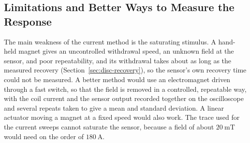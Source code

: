 \documentclass[12pt,a4paper]{article}
\begin{document}
\subsection{Limitations and Better Ways to Measure the Response}
\label{sec:disc-limitations}

The main weakness of the current method is the saturating stimulus. A hand-held magnet gives an uncontrolled withdrawal speed, an unknown field at the sensor, and poor repeatability, and its withdrawal takes about as long as the measured recovery (Section~\ref{sec:disc-recovery}), so the sensor's own recovery time could not be measured. A better method would use an electromagnet driven through a fast switch, so that the field is removed in a controlled, repeatable way, with the coil current and the sensor output recorded together on the oscilloscope and several repeats taken to give a mean and standard deviation. A linear actuator moving a magnet at a fixed speed would also work. The trace used for the current sweeps cannot saturate the sensor, because a field of about $\SI{20}{\milli\tesla}$ would need on the order of $\SI{180}{\ampere}$.
\end{document}
